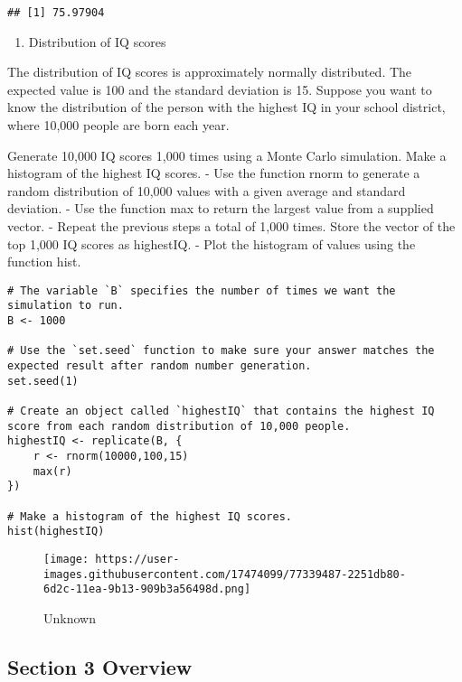 \documentclass[
]{article}
\providecommand{\tightlist}{%
  \setlength{\itemsep}{0pt}\setlength{\parskip}{0pt}}
\begin{document}
\begin{verbatim}
## [1] 75.97904
\end{verbatim}

\begin{enumerate}
\def\labelenumi{\arabic{enumi}.}
\setcounter{enumi}{6}
\tightlist
\item
  Distribution of IQ scores
\end{enumerate}

The distribution of IQ scores is approximately normally distributed. The
expected value is 100 and the standard deviation is 15. Suppose you want
to know the distribution of the person with the highest IQ in your
school district, where 10,000 people are born each year.

Generate 10,000 IQ scores 1,000 times using a Monte Carlo simulation.
Make a histogram of the highest IQ scores. - Use the function rnorm to
generate a random distribution of 10,000 values with a given average and
standard deviation. - Use the function max to return the largest value
from a supplied vector. - Repeat the previous steps a total of 1,000
times. Store the vector of the top 1,000 IQ scores as highestIQ. - Plot
the histogram of values using the function hist.

\begin{verbatim}
# The variable `B` specifies the number of times we want the simulation to run.
B <- 1000

# Use the `set.seed` function to make sure your answer matches the expected result after random number generation.
set.seed(1)

# Create an object called `highestIQ` that contains the highest IQ score from each random distribution of 10,000 people.
highestIQ <- replicate(B, {
    r <- rnorm(10000,100,15)
    max(r)
})

# Make a histogram of the highest IQ scores.
hist(highestIQ)
\end{verbatim}

\begin{figure}
\centering
\texttt{[image: https://user-images.githubusercontent.com/17474099/77339487-2251db80-6d2c-11ea-9b13-909b3a56498d.png]}
\caption{Unknown}
\end{figure}

\hypertarget{section-3-overview}{%
\subsection{Section 3 Overview}\label{section-3-overview}}
\end{document}
